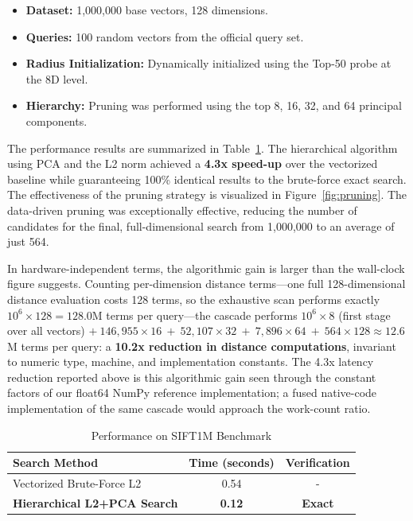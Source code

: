 \documentclass[sigconf,nonacm]{acmart}
\begin{document}
\begin{itemize}
    \item \textbf{Dataset:} 1,000,000 base vectors, 128 dimensions.
    \item \textbf{Queries:} 100 random vectors from the official query set.
    \item \textbf{Radius Initialization:} Dynamically initialized using the Top-50 probe at the 8D level.
    \item \textbf{Hierarchy:} Pruning was performed using the top 8, 16, 32, and 64 principal components.
\end{itemize}

The performance results are summarized in Table~\ref{tab:results}. The hierarchical algorithm using PCA and the L2 norm achieved a \textbf{4.3x speed-up} over the vectorized baseline while guaranteeing 100\% identical results to the brute-force exact search. The effectiveness of the pruning strategy is visualized in Figure~\ref{fig:pruning}. The data-driven pruning was exceptionally effective, reducing the number of candidates for the final, full-dimensional search from 1,000,000 to an average of just 564.

In hardware-independent terms, the algorithmic gain is larger than the wall-clock figure suggests. Counting per-dimension distance terms---one full 128-dimensional distance evaluation costs 128 terms, so the exhaustive scan performs exactly $10^{6} \times 128 = 128.0$M terms per query---the cascade performs $10^{6}\times 8$ (first stage over all vectors) $+\ 146{,}955\times16\ +\ 52{,}107\times32\ +\ 7{,}896\times64\ +\ 564\times128 \approx 12.6$M terms per query: a \textbf{10.2x reduction in distance computations}, invariant to numeric type, machine, and implementation constants. The 4.3x latency reduction reported above is this algorithmic gain seen through the constant factors of our float64 NumPy reference implementation; a fused native-code implementation of the same cascade would approach the work-count ratio.

\begin{table}[h]
  \caption{Performance on SIFT1M Benchmark}
  \label{tab:results}
  \begin{tabular}{lcc}
    \toprule
    \textbf{Search Method} & \textbf{Time (seconds)} & \textbf{Verification}\\
    \midrule
    Vectorized Brute-Force L2 & 0.54 & - \\
    \textbf{Hierarchical L2+PCA Search} & \textbf{0.12} & \textbf{Exact}\\
    \bottomrule
  \end{tabular}
\end{table}
\end{document}
